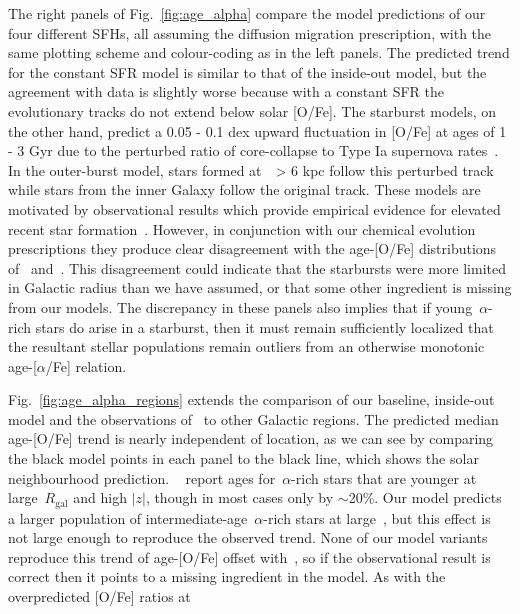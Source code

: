 \documentclass[draft2.tex]{subfiles}
\begin{document}
\par 
The right panels of Fig.~\ref{fig:age_alpha} compare the model predictions of 
our four different SFHs, all assuming the diffusion migration prescription, 
with the same plotting scheme and colour-coding as in the left panels. 
The predicted trend for the constant SFR model is similar to that of the 
inside-out model, but the agreement with data is slightly worse because with a 
constant SFR the evolutionary tracks do not extend below solar [O/Fe]. 
The starburst models, on the other hand, predict a 0.05 - 0.1 dex upward 
fluctuation in [O/Fe] at ages of 1 - 3 Gyr due to the perturbed ratio of 
core-collapse to Type Ia supernova rates~\citep{Johnson2020}. 
In the outer-burst model, stars formed at~\rgal~> 6 kpc follow this perturbed 
track while stars from the inner Galaxy follow the original track. 
These models are motivated by observational results which provide empirical 
evidence for elevated recent star formation~\citep{Mor2019, Isern2019}. 
However, in conjunction with our chemical evolution prescriptions they produce 
clear disagreement with the age-[O/Fe] distributions of~\citet{Feuillet2019} 
and~\citet{Miglio2021}. 
This disagreement could indicate that the starbursts were more limited in 
Galactic radius than we have assumed, or that some other ingredient is missing 
from our models. 
The discrepancy in these panels also implies that if young~$\alpha$-rich stars 
do arise in a starburst, then it must remain sufficiently localized that the 
resultant stellar populations remain outliers from an otherwise monotonic 
age-[$\alpha$/Fe] relation. 
\par 
Fig.~\ref{fig:age_alpha_regions} extends the comparison of our baseline, 
inside-out model and the observations of~\citet{Feuillet2019} to other 
Galactic regions. 
The predicted median age-[O/Fe] trend is nearly independent of location, as we 
can see by comparing the black model points in each panel to the black line, 
which shows the solar neighbourhood prediction. 
~\citet{Feuillet2019} report ages for~$\alpha$-rich stars that are younger at 
large~$R_\text{gal}$ and high $\left|z\right|$, though in most cases only by 
$\sim$20\%. 
Our model predicts a larger population of intermediate-age~$\alpha$-rich stars 
at large~\rgal, but this effect is not large enough to reproduce the observed 
trend. 
None of our model variants reproduce this trend of age-[O/Fe] offset with~\absz, 
so if the observational result is correct then it points to a missing 
ingredient in the model. 
As with the overpredicted [O/Fe] ratios at 
\end{document}
